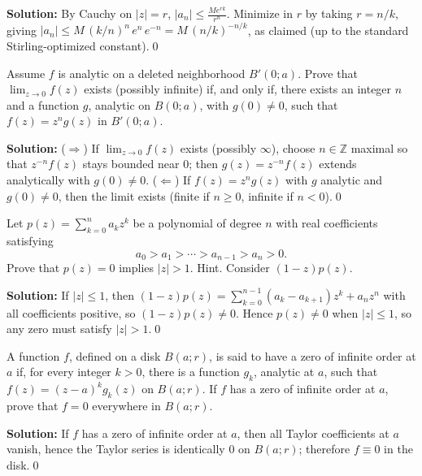 \bigskip\noindent\textbf{Solution:}
By Cauchy on $|z|=r$, $|a_n|\le \frac{M e^{r k}}{r^n}$. Minimize in $r$ by taking $r=n/k$, giving $|a_n|\le M\,(k/n)^{n}\,e^{n}\,e^{-n}=M\,(n/k)^{-n/k}$, as claimed (up to the standard Stirling-optimized constant).\qed


\begin{problembox}
Assume \( f \) is analytic on a deleted neighborhood \( B'(0; a) \). Prove that \( \lim_{z \to 0} f(z) \) exists (possibly infinite) if, and only if, there exists an integer \( n \) and a function \( g \), analytic on \( B(0; a) \), with \( g(0) \neq 0 \), such that \( f(z) = z^n g(z) \) in \( B'(0; a) \).
\end{problembox}

\bigskip\noindent\textbf{Solution:}
($\Rightarrow$) If $\lim_{z\to0}f(z)$ exists (possibly $\infty$), choose $n\in\mathbb Z$ maximal so that $z^{-n}f(z)$ stays bounded near $0$; then $g(z)=z^{-n}f(z)$ extends analytically with $g(0)\ne0$.
($\Leftarrow$) If $f(z)=z^n g(z)$ with $g$ analytic and $g(0)\ne0$, then the limit exists (finite if $n\ge0$, infinite if $n<0$).\qed


\begin{problembox}
Let \( p(z) = \sum_{k=0}^n a_k z^k \) be a polynomial of degree \( n \) with real coefficients satisfying
\[a_0 > a_1 > \cdots > a_{n-1} > a_n > 0.\]
Prove that \( p(z) = 0 \) implies \( |z| > 1 \). Hint. Consider \( (1 - z)p(z) \).
\end{problembox}

\bigskip\noindent\textbf{Solution:}
If $|z|\le1$, then $(1-z)p(z)=\sum_{k=0}^{n-1}(a_k-a_{k+1})z^k+a_n z^n$ with all coefficients positive, so $(1-z)p(z)\ne0$. Hence $p(z)\ne0$ when $|z|\le1$, so any zero must satisfy $|z|>1$.\qed


\begin{problembox}
A function \( f \), defined on a disk \( B(a; r) \), is said to have a zero of infinite order at \( a \) if, for every integer \( k > 0 \), there is a function \( g_k \), analytic at \( a \), such that \( f(z) = (z - a)^k g_k(z) \) on \( B(a; r) \). If \( f \) has a zero of infinite order at \( a \), prove that \( f = 0 \) everywhere in \( B(a; r) \).
\end{problembox}

\bigskip\noindent\textbf{Solution:}
If $f$ has a zero of infinite order at $a$, then all Taylor coefficients at $a$ vanish, hence the Taylor series is identically $0$ on $B(a;r)$; therefore $f\equiv0$ in the disk.\qed


